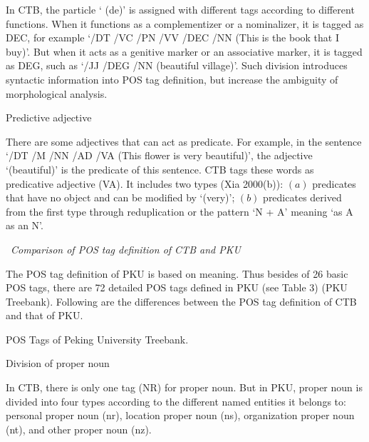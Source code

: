 \documentclass[english]{jnlp_1.4}
\renewcommand{\subsubsection}{}
\begin{document}
In CTB, the particle ` (de)' is assigned with different tags 
according to different functions. When it functions as a complementizer or a 
nominalizer, it is tagged as DEC, for example `/DT /VC /PN /VV /DEC /NN (This is the book 
that I buy)'. But when it acts as a genitive marker or an associative 
marker, it is tagged as DEG, such as `/JJ /DEG 
/NN (beautiful village)'. Such division introduces 
syntactic information into POS tag definition, but increase the ambiguity of 
morphological analysis.


\subsubsection{Predictive adjective}

There are some adjectives that can act as predicate. For example, in the 
sentence `/DT /M /NN /AD 
/VA (This flower is very beautiful)', the adjective 
`(beautiful)' is the predicate of this sentence. CTB 
tags these words as predicative adjective (VA). It includes two types (Xia 
2000(b)): $(a)$ predicates that have no object and can be modified by 
`(very)'; $(b)$ predicates derived from the first type through 
reduplication or the pattern `N + A' meaning `as A as an N'. 


\noindent
\textendash\ \textit{Comparison of POS tag definition of CTB and PKU}

The POS tag definition of PKU is based on meaning. Thus besides of 26 basic 
POS tags, there are 72 detailed POS tags defined in PKU (see Table 3) (PKU 
Treebank). Following are the differences between the POS tag definition of 
CTB and that of PKU.

\begin{table}[t]
\caption{POS Tags of Peking University Treebank.} 

\end{table}


\setcounter{subsubsection}{0}
\subsubsection{Division of proper noun}

In CTB, there is only one tag (NR) for proper noun. But in PKU, proper noun 
is divided into four types according to the different named entities it 
belongs to: personal proper noun (nr), location proper noun (ns), 
organization proper noun (nt), and other proper noun (nz). 
\end{document}
